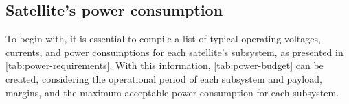 \subsection{Satellite's power consumption}


To begin with, it is essential to compile a list of typical operating voltages, currents, and power consumptions for each satellite's subsystem, as presented in \autoref{tab:power-requirements}. With this information, \autoref{tab:power-budget} can be created, considering the operational period of each subsystem and payload, margins, and the maximum acceptable power consumption for each subsystem.

